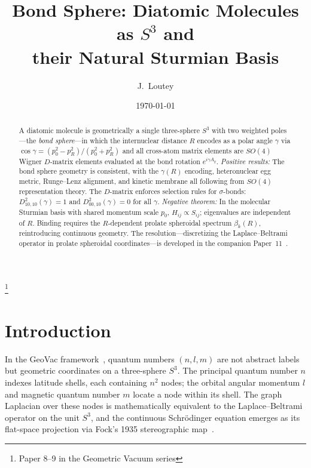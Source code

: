 \documentclass[aps,pra,twocolumn,superscriptaddress,longbibliography]{revtex4-2}
\begin{document}
\title{Bond Sphere: Diatomic Molecules as $S^3$ and\\
their Natural Sturmian Basis}
\thanks{Paper 8--9 in the Geometric Vacuum series}

\author{J.~Loutey}

\date{\today}

\begin{abstract}
A diatomic molecule is geometrically a single three-sphere $S^3$ with two
weighted poles---the \emph{bond sphere}---in which the internuclear distance
$R$ encodes as a polar angle $\gamma$ via
$\cos\gamma = (p_0^2 - p_R^2)/(p_0^2 + p_R^2)$ and all cross-atom matrix
elements are $SO(4)$ Wigner $D$-matrix elements evaluated at the bond
rotation $e^{i\gamma A_y}$.
\emph{Positive results:}
The bond sphere geometry is consistent, with the $\gamma(R)$ encoding,
heteronuclear egg metric, Runge--Lenz alignment, and kinetic membrane all
following from $SO(4)$ representation theory.
The $D$-matrix enforces selection rules for $\sigma$-bonds:
$D^2_{10,10}(\gamma) = 1$ and $D^2_{00,10}(\gamma) = 0$ for all $\gamma$.
\emph{Negative theorem:}
In the molecular Sturmian basis with shared momentum scale $p_0$,
$H_{ij} \propto S_{ij}$; eigenvalues are independent of $R$.
Binding requires the $R$-dependent prolate spheroidal spectrum $\beta_k(R)$,
reintroducing continuous geometry.
The resolution---discretizing the Laplace--Beltrami operator in prolate
spheroidal coordinates---is developed in the companion
Paper~11~\cite{loutey_paper11}.
\end{abstract}

\maketitle


\section{Introduction}
\label{sec:intro}

In the GeoVac framework~\cite{loutey_paper0,loutey_paper1,loutey_paper7},
quantum numbers $(n, l, m)$ are not abstract labels but geometric coordinates
on a three-sphere $S^3$.  The principal quantum number $n$ indexes latitude
shells, each containing $n^2$ nodes; the orbital angular momentum $l$ and
magnetic quantum number $m$ locate a node within its shell.  The graph
Laplacian over these nodes is mathematically equivalent to the Laplace--Beltrami
operator on the unit $S^3$, and the continuous Schr\"odinger equation emerges
as its flat-space projection via Fock's 1935 stereographic
map~\cite{Fock1935,loutey_paper7}.
\end{document}
